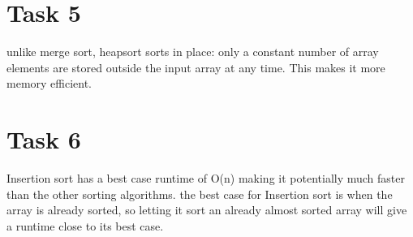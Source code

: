 \documentclass[12pt]{article}
\begin{document}
\section{Task 5}
unlike merge sort, heapsort sorts in place: only a constant number of array elements are stored outside the input array at any time. This makes it more memory efficient. 

\section{Task 6}
Insertion sort has a best case runtime of O(n) making it potentially much faster than the other sorting algorithms. the best case for Insertion sort is when the array is already sorted, so letting it sort an already almost sorted array will give a runtime close to its best case.



\end{document}
